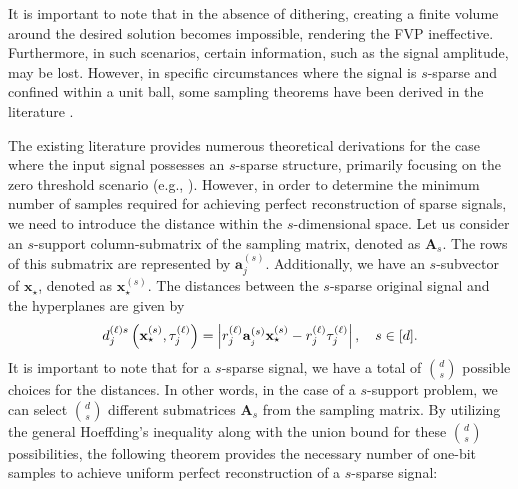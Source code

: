 \documentclass[12pt,draftcls,onecolumn]{IEEEtran}
\begin{document}
It is important to note that in the absence of dithering, creating a finite volume around the desired solution becomes impossible, rendering the FVP ineffective. Furthermore, in such scenarios, certain information, such as the signal amplitude, may be lost. However, in specific circumstances where the signal is $s$-sparse and confined within a unit ball, some sampling theorems have been derived in the literature \cite[Theorem~2]{jacques2013robust}.

The existing literature provides numerous theoretical derivations for the case where the input signal possesses an $s$-sparse structure, primarily focusing on the zero threshold scenario (e.g., \cite[Theorem~2]{jacques2013robust}). However, in order to determine the minimum number of samples required for achieving perfect reconstruction of sparse signals, we need to introduce the distance within the $s$-dimensional space. Let us consider an $s$-support column-submatrix of the sampling matrix, denoted as $\mathbf{A}_s$. The rows of this submatrix are represented by $\mathbf{a}^{(s)}_j$. Additionally, we have an $s$-subvector of $\mathbf{x}_\star$, denoted as $\mathbf{x}^{(s)}_\star$. The distances between the $s$-sparse original signal and the hyperplanes are given by
\begin{equation}
\label{distance_st}
d^{(\ell)s}_{j}\left(\mathbf{x}_{\star}^{(s)},\tau_{j}^{(\ell)}\right)=\left|r^{(\ell)}_{j}\mba^{(s)}_{_{j}}\mathbf{x}_{\star}^{(s)}-r^{(\ell)}_{j}\tau^{(\ell)}_{j}\right|,\quad s\in [d]. 
\end{equation}\normalsize
It is important to note that for a $s$-sparse signal, we have a total of $\binom{d}{s}$ 
possible choices for the distances. In other words, in the case of a $s$-support problem, we can select $\binom{d}{s}$ %
different submatrices $\mathbf{A}_s$ from the sampling matrix. By utilizing the general Hoeffding's inequality along with the union bound for these $\binom{d}{s}$
possibilities, the following theorem provides the necessary number of one-bit samples to achieve uniform perfect reconstruction of a $s$-sparse signal:
\end{document}
